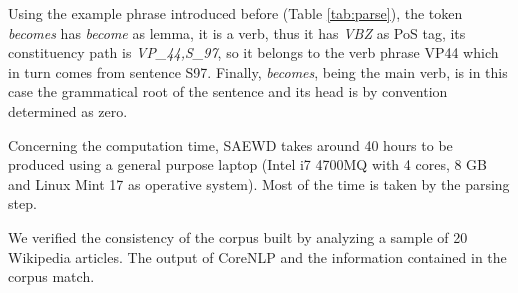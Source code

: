 Using the example phrase introduced before (Table \ref{tab:parse}), the token \textit{becomes} has \textit{become} as lemma, it is a verb, thus it has \textit{VBZ} as PoS tag, its constituency path is \textit{VP\_44,S\_97}, so it belongs to the verb phrase {VP44} which in turn comes from sentence {S97}. Finally, \textit{becomes}, being the main verb, is in this case the grammatical root of the sentence and its head is by convention determined as  zero. 

Concerning the computation time, SAEWD takes around 40 hours to be produced using a general purpose laptop (Intel i7 4700MQ with 4 cores, 8 GB and Linux Mint 17 as operative system). Most of the time is taken by the parsing step. 

We verified the consistency of the corpus built by analyzing a sample of 20 Wikipedia articles. The output of CoreNLP and the information contained in the corpus match.



